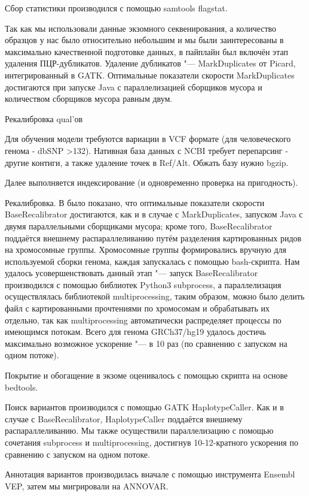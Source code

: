 \documentclass[a4paper,12pt]{article}
\begin{document}
Сбор статистики производился с помощью samtools flagstat.

Так как мы использовали данные экзомного секвенирования, а количество образцов у нас было относительно небольшим и мы были заинтересованы в максимально качественной подготовке данных, в пайплайн был включён этап удаления ПЦР-дубликатов.
Удаление дубликатов "--- MarkDuplicates от Picard\cite{picard}, интегрированный в GATK.
Оптимальные показатели скорости MarkDuplicates достигаются при запуске Java с параллелизацией сборщиков мусора и количеством сборщиков мусора равным двум\cite{heldenbrand}.

Рекалибровка qual'ов

Для обучения модели требуются вариации в VCF формате (для человеческого генома - dbSNP >132). Нативная база данных с NCBI требует перепарсинг - другие контиги, а также удаление точек в Ref/Alt. Обжать базу нужно bgzip.

Далее выполняется индексирование (и одновременно проверка на пригодность).

Рекалибровка.
В \cite{heldenbrand} было показано, что оптимальные показатели скорости BaseRecalibrator достигаются, как и в случае с MarkDuplicates, запуском Java с двумя параллельными сборщиками мусора;
кроме того, BaseRecalibrator поддаётся внешнему распараллеливанию путём разделения картированных ридов на хромосомные группы.
Хромосомные группы формировались вручную для используемой сборки генома, каждая запускалась с помощью bash-скрипта.
Нам удалось усовершенствовать данный этап "--- запуск BaseRecalibrator производился с помощью библиотек Python3 subprocess, а параллелизация осуществлялась библиотекой multiprocessing, таким образом, можно было делить файл с картированными прочтениями по хромосомам и обрабатывать их отдельно, так как multiprocessing автоматически распределяет процессы по имеющимся потокам.
Всего для генома GRCh37/hg19 удалось достичь максимально возможное ускорение "--- в 10 раз (по сравнению с запуском на одном потоке).

Покрытие и обогащение в экзоме оценивалось с помощью скрипта на основе bedtools\cite{bedtools}.

Поиск вариантов производился с помощью GATK HaplotypeCaller.
Как и в случае с BaseRecalibrator, HaplotypeCaller поддаётся внешнему распараллеливанию\cite{heldenbrand}.
Мы также осуществили параллелизацию с помощью сочетания subprocess и multiprocessing, достигнув 10-12-кратного ускорения по сравнению с запуском на одном потоке.

Аннотация вариантов производилась вначале с помощью инструмента Ensembl VEP\cite{vep}, затем мы мигрировали на ANNOVAR\cite{annovar}.
\end{document}
